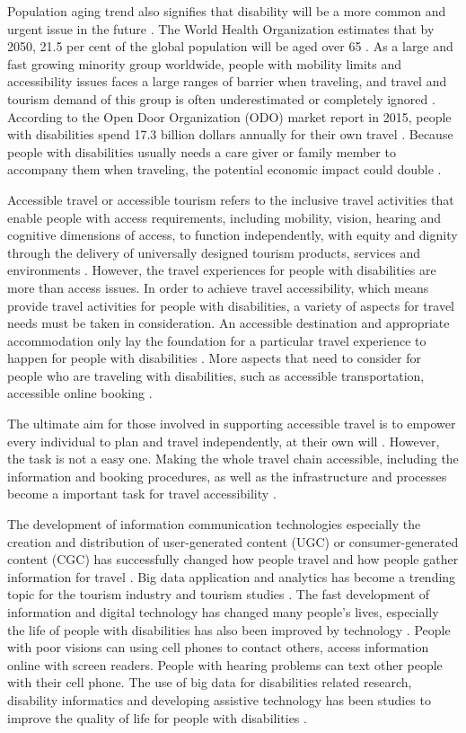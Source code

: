 Population aging trend also signifies that disability will be a more common
and urgent issue in the future \cite{Grue}. The World Health Organization estimates that
by 2050, 21.5 per cent of the global population will be aged over 65 \cite{Ama}. As a large
and fast growing minority group worldwide, people with mobility limits and accessibility 
issues faces a large ranges of barrier when traveling, and travel and tourism demand of 
this group is often underestimated or completely ignored \cite{Ama}. According to the
Open Door Organization (ODO) market report in 2015, people with disabilities spend 17.3
billion dollars annually for their own travel \cite{ODO}. Because people with disabilities
usually needs a care giver or family member to accompany them when traveling, the potential
economic impact could double \cite{ODO}. 


Accessible travel or accessible tourism refers to the inclusive travel activities that
enable people with access requirements, including mobility, vision, hearing and cognitive
dimensions of access, to function independently, with equity and dignity through the
delivery of universally designed tourism products, services and environments \cite{Ama}.
However, the travel experiences for people with disabilities are more than access
issues. In order to achieve travel accessibility, which means provide travel activities
for people with disabilities, a variety of aspects for travel needs must be taken in
consideration. An accessible destination and appropriate accommodation only lay the 
foundation for a particular travel experience to happen for people with 
disabilities \cite{ODO}. More aspects that need to
consider for people who are traveling with disabilities, such as accessible
transportation, accessible online booking \cite{Ama}.

The ultimate aim for those involved in supporting accessible travel is to empower every
individual to plan and travel independently, at their own will \cite{zhang2016}. However,
the task is not a easy one. Making the whole travel chain accessible, including the
information and booking procedures, as well as the infrastructure and processes become a
important task for travel accessibility \cite{Ama}. 

The development of information communication technologies especially the creation
and distribution of user-generated content (UGC) or consumer-generated content (CGC) has
successfully changed how people travel and how people gather information for travel
\cite{chung2009}. Big data application and analytics has become a trending topic for
the tourism industry and tourism studies \cite{chung2009}. The fast development of 
information and digital technology has changed many people's
lives, especially the life of people with disabilities has also been improved by
technology \cite{GJT14}. People with poor visions can using cell phones to contact
others, access information online with screen readers. People with hearing problems can
text other people with their cell phone. The use of big data for disabilities related
research, disability informatics and developing assistive technology has been studies
to improve the quality of life for people with disabilities \cite{Grue}. 

